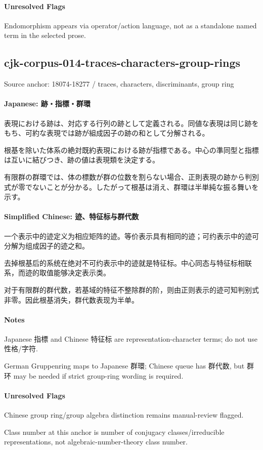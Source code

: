 \documentclass[11pt]{article}
\begin{document}
\paragraph{Unresolved Flags}
Endomorphism appears via operator/action language, not as a standalone named term in the selected prose.\par
\subsection*{cjk-corpus-014-traces-characters-group-rings}
Source anchor: 18074-18277 / traces, characters, discriminants, group ring
\par
\paragraph{Japanese: 跡・指標・群環}
表現における跡は、対応する行列の跡として定義される。同値な表現は同じ跡をもち、可約な表現では跡が組成因子の跡の和として分解される。\par
根基を除いた体系の絶対既約表現における跡が指標である。中心の準同型と指標は互いに結びつき、跡の値は表現類を決定する。\par
有限群の群環では、体の標数が群の位数を割らない場合、正則表現の跡から判別式が零でないことが分かる。したがって根基は消え、群環は半単純な振る舞いを示す。\par
\paragraph{Simplified Chinese: 迹、特征标与群代数}
一个表示中的迹定义为相应矩阵的迹。等价表示具有相同的迹；可约表示中的迹可分解为组成因子的迹之和。\par
去掉根基后的系统在绝对不可约表示中的迹就是特征标。中心同态与特征标相联系，而迹的取值能够决定表示类。\par
对于有限群的群代数，若基域的特征不整除群的阶，则由正则表示的迹可知判别式非零。因此根基消失，群代数表现为半单。\par
\paragraph{Notes}
Japanese 指標 and Chinese 特征标 are representation-character terms; do not use 性格/字符.\par
German Gruppenring maps to Japanese 群環; Chinese queue has 群代数, but 群环 may be needed if strict group-ring wording is required.\par
\paragraph{Unresolved Flags}
Chinese group ring/group algebra distinction remains manual-review flagged.\par
Class number at this anchor is number of conjugacy classes/irreducible representations, not algebraic-number-theory class number.\par
\end{document}
